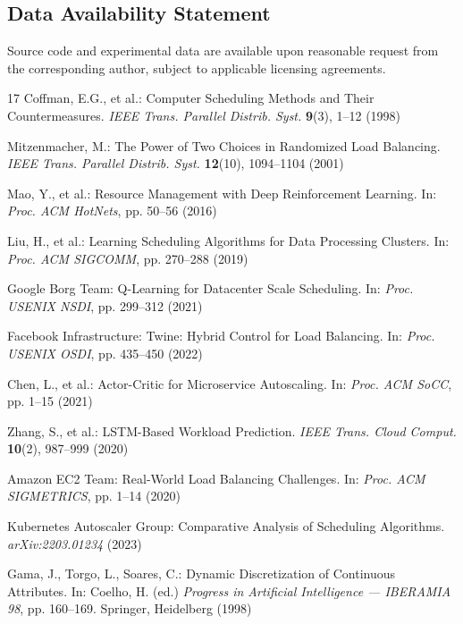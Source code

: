 \documentclass[runningheads]{llncs}
\begin{document}
\subsection{Data Availability Statement}
Source code and experimental data are available upon reasonable request from the corresponding author, subject to applicable licensing agreements.




\begin{thebibliography}{17}
Coffman, E.G., et al.: Computer Scheduling Methods and Their Countermeasures. \emph{IEEE Trans. Parallel Distrib. Syst.} \textbf{9}(3), 1--12 (1998)

Mitzenmacher, M.: The Power of Two Choices in Randomized Load Balancing. \emph{IEEE Trans. Parallel Distrib. Syst.} \textbf{12}(10), 1094--1104 (2001)

Mao, Y., et al.: Resource Management with Deep Reinforcement Learning. In: \emph{Proc. ACM HotNets}, pp. 50--56 (2016)

Liu, H., et al.: Learning Scheduling Algorithms for Data Processing Clusters. In: \emph{Proc. ACM SIGCOMM}, pp. 270--288 (2019)

Google Borg Team: Q-Learning for Datacenter Scale Scheduling. In: \emph{Proc. USENIX NSDI}, pp. 299--312 (2021)

Facebook Infrastructure: Twine: Hybrid Control for Load Balancing. In: \emph{Proc. USENIX OSDI}, pp. 435--450 (2022)

Chen, L., et al.: Actor-Critic for Microservice Autoscaling. In: \emph{Proc. ACM SoCC}, pp. 1--15 (2021)

Zhang, S., et al.: LSTM-Based Workload Prediction. \emph{IEEE Trans. Cloud Comput.} \textbf{10}(2), 987--999 (2020)

Amazon EC2 Team: Real-World Load Balancing Challenges. In: \emph{Proc. ACM SIGMETRICS}, pp. 1--14 (2020)

Kubernetes Autoscaler Group: Comparative Analysis of Scheduling Algorithms. \emph{arXiv:2203.01234} (2023)

Gama, J., Torgo, L., Soares, C.: Dynamic Discretization of Continuous Attributes. In: Coelho, H. (ed.) \emph{Progress in Artificial Intelligence — IBERAMIA 98}, pp. 160--169. Springer, Heidelberg (1998)


\end{thebibliography}
\end{document}
